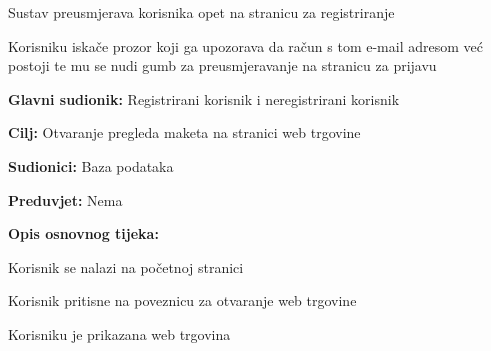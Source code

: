 \begin{packed_item}
\begin{packed_item}
\begin{packed_enum}
								\item Sustav preusmjerava korisnika opet na stranicu za registriranje
								\item Korisniku iskače prozor koji ga upozorava da račun s tom e-mail adresom već postoji te mu se nudi gumb za preusmjeravanje na stranicu za prijavu
								
							\end{packed_enum}
							
						\end{packed_item}
						
					\end{packed_item}
				
					\noindent {}
					\begin{packed_item}
						
						\item \textbf{Glavni sudionik: }Registrirani korisnik i neregistrirani korisnik
						\item  \textbf{Cilj:} Otvaranje pregleda maketa na stranici web trgovine
						\item  \textbf{Sudionici:} Baza podataka
						\item  \textbf{Preduvjet:} Nema
						\item  \textbf{Opis osnovnog tijeka:}
						
						\item[] \begin{packed_enum}
							
							\item Korisnik se nalazi na početnoj stranici
							\item Korisnik pritisne na poveznicu za otvaranje web trgovine
							\item Korisniku je prikazana web trgovina
							
						\end{packed_enum}
						
					\end{packed_item}
						
